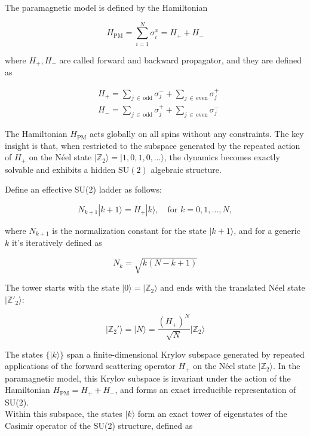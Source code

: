 \documentclass{article}
\begin{document}
The paramagnetic model is defined by the Hamiltonian

\begin{equation}
    H_{\mathrm{PM}} = \sum_{i=1}^N \sigma^x_i = H_+ + H_-   
\end{equation}

where $H_+, H_-$ are called forward and backward propagator, and they are defined as

\begin{align}
&H_+ = \sum_{j\,\in\,\mathrm{odd}} \sigma_j^- + \sum_{j\,\in\,\mathrm{even}} \sigma_j^+\\
&H_- = \sum_{j\,\in\,\mathrm{odd}} \sigma_j^+ + \sum_{j\,\in\,\mathrm{even}} \sigma_j^-
\end{align}

The Hamiltonian $H_{\mathrm{PM}}$ acts globally on all spins without any constraints. The key insight is that, when restricted to the subspace generated by the repeated action of \( H_+ \) on the Néel state \( |\mathbb{Z}_2\rangle = |1,0,1,0,\dots\rangle \), the dynamics becomes exactly solvable and exhibits a hidden \(\mathrm{SU}(2)\) algebraic structure.

Define an effective SU(2) ladder as follows:

\begin{equation}\label{enoa}
    N_{k+1}|k+1\rangle = H_+ |k\rangle, \quad \text{for } k = 0, 1, \dots, N,
\end{equation}

where \( N_{k+1} \) is the normalization constant for the state $|k+1\rangle$, and for a generic $k$ it's iteratively defined as

\begin{equation}\label{econst}
N_k = \sqrt{k \left( N - k + 1 \right)}
\end{equation}

The tower starts with the state $|0\rangle = |\mathbb{Z}_2\rangle $ and ends with the translated Néel state \( |\mathbb{Z'}_2\rangle \):

\begin{equation}
|\mathbb{Z}_2'\rangle = |N\rangle = \frac{(H_+)^N}{\sqrt{N}} |\mathbb{Z}_2\rangle
\end{equation}

The states \( \{ |k\rangle \} \) span a finite-dimensional Krylov subspace generated by repeated applications of the forward scattering operator \( H_+ \) on the Néel state \( |\mathbb{Z}_2\rangle \). In the paramagnetic model, this Krylov subspace is invariant under the action of the Hamiltonian \( H_{\mathrm{PM}} = H_+ + H_- \), and forms an exact irreducible representation of SU(2).\\
Within this subspace, the states \( |k\rangle \) form an exact tower of eigenstates of the Casimir operator of the SU(2) structure, defined as
\end{document}
